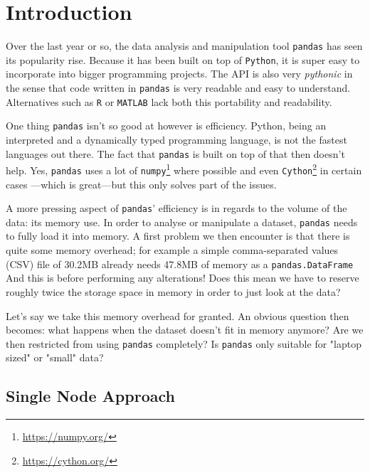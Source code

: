 \section{Introduction}

Over the last year or so, the data analysis and manipulation tool \texttt{pandas} \cite{mckinney2011pandas} has seen its popularity rise. Because it has been built on top of \texttt{Python}, it is super easy to incorporate into bigger programming projects. The API is also very \textit{pythonic} in the sense that code written in \texttt{pandas} is very readable and easy to understand. Alternatives such as \texttt{R} or \texttt{MATLAB} lack both this portability and readability.

One thing \texttt{pandas} isn't so good at however is efficiency. Python, being an interpreted and a dynamically typed programming language, is not the fastest languages out there. The fact that \texttt{pandas} is built on top of that then doesn't help. Yes, \texttt{pandas} uses a lot of \texttt{numpy}\footnote{\url{https://numpy.org/}} where possible and even \texttt{Cython}\footnote{\url{https://cython.org/}} in certain cases \cite[p.~4]{mckinney2012python}---which is great---but this only solves part of the issues.

A more pressing aspect of \texttt{pandas}' efficiency is in regards to the volume of the data: its memory use. In order to analyse or manipulate a dataset, \texttt{pandas} needs to fully load it into memory. A first problem we then encounter is that there is quite some memory overhead; for example a simple comma-separated values (CSV) file of 30.2MB already needs 47.8MB of memory as a \texttt{pandas.DataFrame} And this is before performing any alterations! Does this mean we have to reserve roughly twice the storage space in memory in order to just look at the data?

Let's say we take this memory overhead for granted. An obvious question then becomes: what happens when the dataset doesn't fit in memory anymore? Are we then restricted from using \texttt{pandas} completely? Is \texttt{pandas} only suitable for "laptop sized" or "small" data?

\subsection{Single Node Approach}

